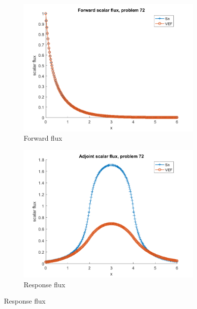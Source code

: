 \documentclass{article}
\begin{document}
\begin{figure}[H]
\label{Case72Flux}
\centering
\begin{subfigure}{.5\textwidth}
  \centering
  \includegraphics[width=.98\linewidth]{IanProposal/figures2/72phi.png}
  \caption{Forward flux}
  \label{fig:sfig1}
\end{subfigure}%
\begin{subfigure}{.5\textwidth}
  \centering
  \includegraphics[width=.98\linewidth]{IanProposal/figures2/72phia.png}
  \caption{Response flux}
  \label{fig:sfig4}
\end{subfigure}%
\end{figure}
\end{document}
